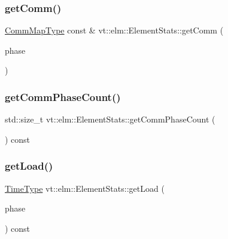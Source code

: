 \subsubsection{\texorpdfstring{get\+Comm()}{getComm()}}
{\footnotesize\ttfamily \hyperlink{namespacevt_1_1elm_a38487cb8896b9b4763efa9022fab560e}{Comm\+Map\+Type} const  \& vt\+::elm\+::\+Element\+Stats\+::get\+Comm (\begin{DoxyParamCaption}\item[{\hyperlink{namespacevt_a46ce6733d5cdbd735d561b7b4029f6d7}{Phase\+Type} const \&}]{phase }\end{DoxyParamCaption})}

\mbox{\label{structvt_1_1elm_1_1_element_stats_a14daf54c633594bccdf408d8e0053792}} 
\subsubsection{\texorpdfstring{get\+Comm\+Phase\+Count()}{getCommPhaseCount()}}
{\footnotesize\ttfamily std\+::size\+\_\+t vt\+::elm\+::\+Element\+Stats\+::get\+Comm\+Phase\+Count (\begin{DoxyParamCaption}{ }\end{DoxyParamCaption}) const}

\mbox{\label{structvt_1_1elm_1_1_element_stats_a256c7acd901c72b6813085756200e2b6}} 
\subsubsection{\texorpdfstring{get\+Load()}{getLoad()}\hspace{0.1cm}{\footnotesize\ttfamily [1/2]}}
{\footnotesize\ttfamily \hyperlink{namespacevt_a876a9d0cd5a952859c72de8a46881442}{Time\+Type} vt\+::elm\+::\+Element\+Stats\+::get\+Load (\begin{DoxyParamCaption}\item[{\hyperlink{namespacevt_a46ce6733d5cdbd735d561b7b4029f6d7}{Phase\+Type} const \&}]{phase }\end{DoxyParamCaption}) const}

